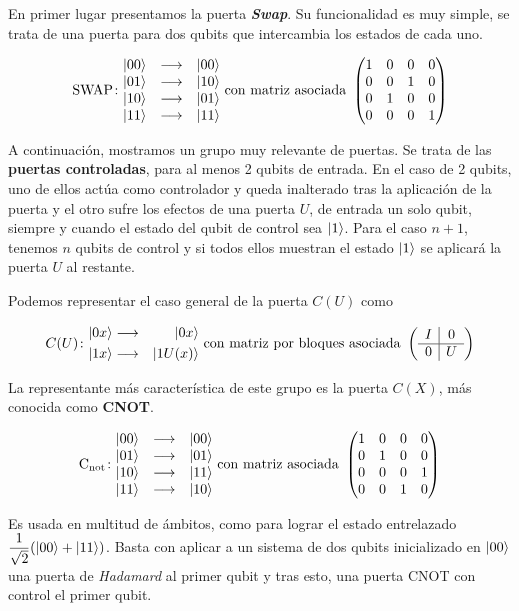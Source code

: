 En primer lugar presentamos la puerta \textbf{\textit{Swap}}. Su funcionalidad es muy simple, se trata de una puerta para dos qubits que intercambia los estados de cada uno.

\[\gatefour{\mathrm{SWAP}}{\ket{00}}{\ket{10}}{\ket{01}}{\ket{11}}\mathrm{\ con\ matriz\ asociada\ }\left(\begin{matrix}1&0&0&0\\0&0&1&0\\0&1&0&0\\0&0&0&1\end{matrix}\right)\]

A continuación, mostramos un grupo muy relevante de puertas. Se trata de las \textbf{puertas controladas}, para al menos 2 qubits de entrada. En el caso de 2 qubits, uno de ellos actúa como controlador y queda inalterado tras la aplicación de la puerta y el otro sufre los efectos de una puerta $U$, de entrada un solo qubit, siempre y cuando el estado del qubit de control sea $\left|1\right\rangle$. Para el caso $n+1$, tenemos $n$ qubits de control y si todos ellos muestran el estado $\left|1\right\rangle$ se aplicará la puerta $U$ al restante.

Podemos representar el caso general de la puerta $C(U)$ como

\[C(U)\colon \begin{aligned}\ket{0x}&\longrightarrow&\ket{0x}\\\ket{1x}&\longrightarrow&\ket{1U(x)}\end{aligned} \mathrm{\ con\ matriz\ por\ bloques\ asociada\ }\left(\begin{array}{c|c}I&0\\\hline0&U\end{array}\right)\]

La representante más característica de este grupo es la puerta $C(X)$, más conocida como \textbf{CNOT}.

\[\gatefour{\mathrm{C_{not}}}{\ket{00}}{\ket{01}}{\ket{11}}{\ket{10}}\mathrm{\ con\ matriz\ asociada\ }\left(\begin{matrix}1&0&0&0\\0&1&0&0\\0&0&0&1\\0&0&1&0\end{matrix}\right)\]

Es usada en multitud de ámbitos, como para lograr el estado entrelazado $\dfrac{1}{\sqrt{2}}(\left|00\right\rangle+\left|11\right\rangle)$. Basta con aplicar a un sistema de dos qubits inicializado en $\left|00\right\rangle$ una puerta de \textit{Hadamard} al primer qubit y tras esto, una puerta CNOT con control el primer qubit.

